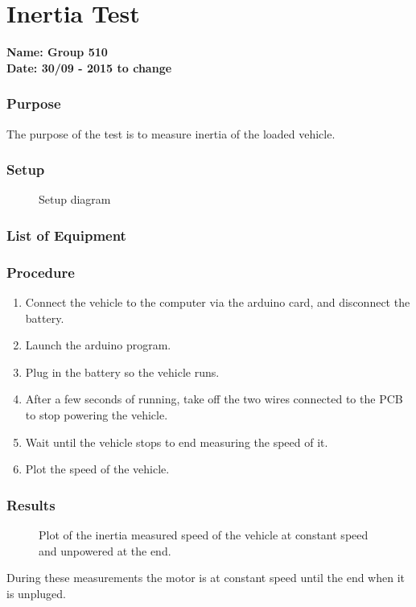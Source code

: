 \pagebreak
\section{Inertia Test}
\nopagebreak
\textbf{Name: Group 510}\\
\textbf{Date: 30/09 - 2015 to change}

\subsubsection{Purpose}
The purpose of the test is to measure inertia of the loaded vehicle.

\subsubsection{Setup}
\begin{figure}[H]
	\centering
	\caption{Setup diagram}
	\label{inertiaTestSetupDiagram}
\end{figure}

\subsubsection{List of Equipment}


\subsubsection{Procedure}

\begin{enumerate}
  \item Connect the vehicle to the computer via the arduino card, and disconnect the battery.
  \item Launch the arduino program.
  \item Plug in the battery so the vehicle runs.
  \item After a few seconds of running, take off the two wires connected to the PCB to stop powering the vehicle.
  \item Wait until the vehicle stops to end measuring the speed of it.
  \item Plot the speed of the vehicle.
\end{enumerate}

\subsubsection{Results}

\begin{figure}[H]
  \centering
  \caption{Plot of the inertia measured speed of the vehicle at constant speed and unpowered at the end.}
  \label{intertiaTestPlot}
\end{figure}

During these measurements the motor is at constant speed until the end when it is unpluged.